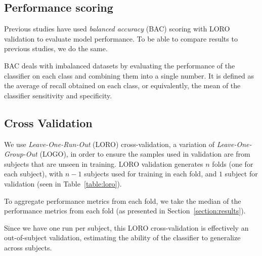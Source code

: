     \subsection{Performance scoring}

        Previous studies have used \emph{balanced accuracy} (BAC) scoring with LORO validation to evaluate model performance. To be able to compare results to previous studies, we do the same. 

        BAC deals with imbalanced datasets by evaluating the performance of the classifier on each class and combining them into a single number. It is defined as the average of recall obtained on each class, or equivalently, the mean of the classifier sensitivity and specificity.

    \subsection{Cross Validation}

        We use \emph{Leave-One-Run-Out} (LORO) cross-validation, a variation of \emph{Leave-One-Group-Out} (LOGO), in order to ensure the samples used in validation are from subjects that are unseen in training. LORO validation generates $n$ folds (one for each subject), with $n-1$ subjects used for training in each fold, and $1$ subject for validation (seen in Table~\ref{table:loro}).

        

        To aggregate performance metrics from each fold, we take the median of the performance metrics from each fold (as presented in Section~\ref{section:results}).

        Since we have one run per subject, this LORO cross-validation is effectively an out-of-subject validation, estimating the ability of the classifier to generalize across subjects.

